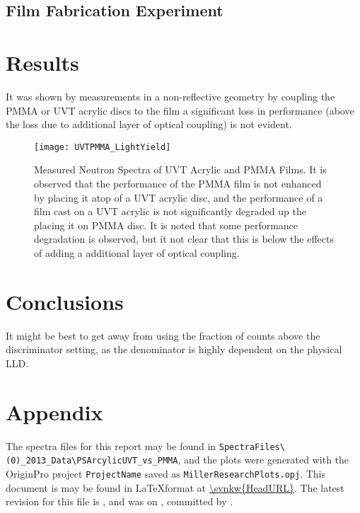 \documentclass[draftcls,onecolumn]{IEEEtran}
\begin{document}
\subsection{Film Fabrication Experiment}

\section{Results}

It was shown by measurements in a non-reflective geometry by coupling the PMMA or UVT acrylic discs to the film a significant loss in performance (above the loss due to additional layer of optical coupling) is not evident.
\begin{figure}
  \centering
  \texttt{[image: UVTPMMA\_LightYield]}
  \caption[Measured Effect of UVT acrylic and PMMA]{Measured Neutron Spectra of UVT Acrylic and PMMA Films. It is observed that the performance of the PMMA film is not enhanced by placing it atop of a UVT acrylic disc, and the performance of a film cast on a UVT acrylic is not significantly degraded up the placing it on PMMA disc. It is noted that some performance degradation is observed, but it not clear that this is below the effects of adding a additional layer of optical coupling.}
  \label{fig:RadMeasuredExper}
\end{figure}

\section{Conclusions}

It might be best to get away from using the fraction of counts above the discriminator setting, as the denominator is highly dependent on the physical LLD.

\pagebreak
\section{Appendix}
The spectra files for this report may be found in \texttt{SpectraFiles\textbackslash(0)\_2013\_Data\textbackslash PSArcylicUVT\_vs\_PMMA}, and the plots were generated with the OriginPro project \texttt{ProjectName} saved as \texttt{MillerResearchPlots.opj}.
This document is may be found in \LaTeX format at \url{\svnkw{HeadURL}}.  
The latest revision for this file is \svnrev, and was on \svndate, committed by \svnauthor.
\end{document}
